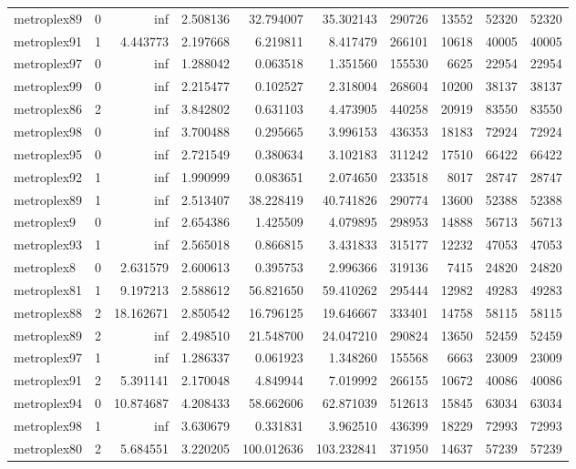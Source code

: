 \begin{longtable}{|l|r|r|r|r|r|r|r|r|r|}
metroplex89 & 0 & inf & 2.508136 & 32.794007 & 35.302143 & 290726 & 13552 & 52320 & 52320 \\
metroplex91 & 1 & 4.443773 & 2.197668 & 6.219811 & 8.417479 & 266101 & 10618 & 40005 & 40005 \\
metroplex97 & 0 & inf & 1.288042 & 0.063518 & 1.351560 & 155530 & 6625 & 22954 & 22954 \\
metroplex99 & 0 & inf & 2.215477 & 0.102527 & 2.318004 & 268604 & 10200 & 38137 & 38137 \\
metroplex86 & 2 & inf & 3.842802 & 0.631103 & 4.473905 & 440258 & 20919 & 83550 & 83550 \\
metroplex98 & 0 & inf & 3.700488 & 0.295665 & 3.996153 & 436353 & 18183 & 72924 & 72924 \\
metroplex95 & 0 & inf & 2.721549 & 0.380634 & 3.102183 & 311242 & 17510 & 66422 & 66422 \\
metroplex92 & 1 & inf & 1.990999 & 0.083651 & 2.074650 & 233518 & 8017 & 28747 & 28747 \\
metroplex89 & 1 & inf & 2.513407 & 38.228419 & 40.741826 & 290774 & 13600 & 52388 & 52388 \\
metroplex9 & 0 & inf & 2.654386 & 1.425509 & 4.079895 & 298953 & 14888 & 56713 & 56713 \\
metroplex93 & 1 & inf & 2.565018 & 0.866815 & 3.431833 & 315177 & 12232 & 47053 & 47053 \\
metroplex8 & 0 & 2.631579 & 2.600613 & 0.395753 & 2.996366 & 319136 & 7415 & 24820 & 24820 \\
metroplex81 & 1 & 9.197213 & 2.588612 & 56.821650 & 59.410262 & 295444 & 12982 & 49283 & 49283 \\
metroplex88 & 2 & 18.162671 & 2.850542 & 16.796125 & 19.646667 & 333401 & 14758 & 58115 & 58115 \\
metroplex89 & 2 & inf & 2.498510 & 21.548700 & 24.047210 & 290824 & 13650 & 52459 & 52459 \\
metroplex97 & 1 & inf & 1.286337 & 0.061923 & 1.348260 & 155568 & 6663 & 23009 & 23009 \\
metroplex91 & 2 & 5.391141 & 2.170048 & 4.849944 & 7.019992 & 266155 & 10672 & 40086 & 40086 \\
metroplex94 & 0 & 10.874687 & 4.208433 & 58.662606 & 62.871039 & 512613 & 15845 & 63034 & 63034 \\
metroplex98 & 1 & inf & 3.630679 & 0.331831 & 3.962510 & 436399 & 18229 & 72993 & 72993 \\
metroplex80 & 2 & 5.684551 & 3.220205 & 100.012636 & 103.232841 & 371950 & 14637 & 57239 & 57239 \\

\end{longtable}

